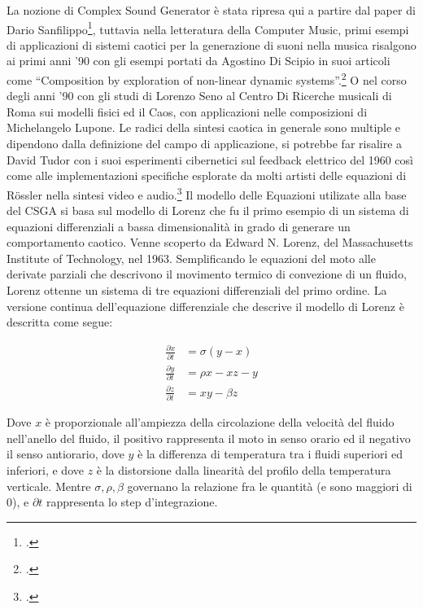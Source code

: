 La nozione di Complex Sound Generator è stata ripresa qui a partire dal
paper di Dario Sanfilippo\footcite{sanfilippo_constrained_2021},
tuttavia nella letteratura della Computer Music, primi esempi di applicazioni
di sistemi caotici per la generazione di suoni nella musica risalgono
ai primi anni '90 con gli esempi portati da Agostino Di Scipio
in suoi articoli come “Composition by exploration of non-linear dynamic systems”.\footcite{discipioiterated}
O nel corso degli anni '90 con gli studi di Lorenzo Seno al Centro Di Ricerche musicali
di Roma sui modelli fisici ed il Caos, con applicazioni nelle composizioni di Michelangelo Lupone.
Le radici della sintesi caotica in generale sono multiple e dipendono
dalla definizione del campo di applicazione, si potrebbe far risalire
a David Tudor con i suoi esperimenti cibernetici sul feedback elettrico del 1960
così come alle implementazioni specifiche esplorate da molti artisti
delle equazioni di Rössler nella sintesi video e audio.\footcite{tom_mudd_gutter_synthesis}
Il modello delle Equazioni utilizate alla base del CSGA si basa sul modello di Lorenz 
che fu il primo esempio di un sistema di equazioni differenziali a bassa
dimensionalità in grado di generare un comportamento caotico.
Venne scoperto da Edward N. Lorenz, del Massachusetts Institute of Technology, nel 1963.
Semplificando le equazioni del moto alle derivate parziali che descrivono il movimento termico di
convezione di un fluido, Lorenz ottenne un sistema di tre equazioni differenziali del primo ordine.
La versione continua dell’equazione differenziale che descrive il modello di Lorenz è descritta come segue: 

\begin{align*}
\frac{\partial x}{\partial t} & = \sigma(y-x) \\
\frac{\partial y}{\partial t} & = \rho x - xz - y \\
\frac{\partial z}{\partial t} & = xy -\beta z 
\end{align*}

Dove \( x \) è proporzionale all’ampiezza della circolazione della velocità del fluido nell’anello del fluido,
il positivo rappresenta il moto in senso orario ed il negativo il senso antiorario,
dove \( y \) è la differenza di temperatura tra i fluidi superiori ed inferiori,
e dove \( z \) è la distorsione dalla linearità del profilo della temperatura verticale.
Mentre \( \sigma,  \rho,  \beta \) governano la relazione fra le quantità (e sono maggiori di 0),
e \( \partial t \) rappresenta lo step d'integrazione. 

